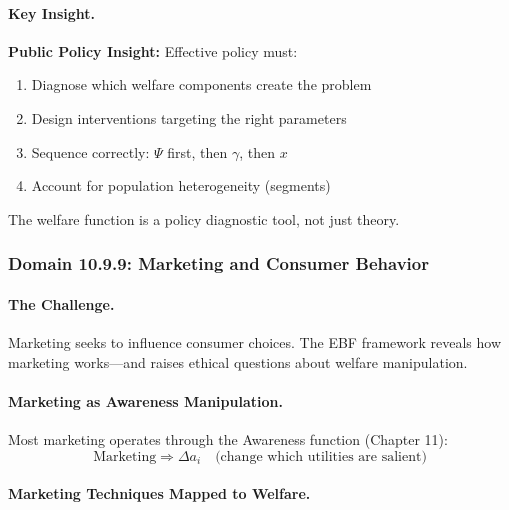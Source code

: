 \paragraph{Key Insight.}
\begin{tcolorbox}[colback=yellow!10!white, colframe=yellow!50!black]
\textbf{Public Policy Insight:}
Effective policy must:
\begin{enumerate}
\item Diagnose which welfare components create the problem
\item Design interventions targeting the right parameters
\item Sequence correctly: $\Psi$ first, then $\gamma$, then $x$
\item Account for population heterogeneity (segments)
\end{enumerate}
The welfare function is a policy diagnostic tool, not just theory.
\end{tcolorbox}

\subsubsection{Domain 10.9.9: Marketing and Consumer Behavior}
\label{subsubsec:marketing}

\paragraph{The Challenge.}
Marketing seeks to influence consumer choices. The EBF framework reveals
how marketing works---and raises ethical questions about welfare manipulation.

\paragraph{Marketing as Awareness Manipulation.}
Most marketing operates through the Awareness function (Chapter 11):
\begin{equation}
\text{Marketing} \Rightarrow \Delta a_i \quad \text{(change which utilities are salient)}
\end{equation}

\paragraph{Marketing Techniques Mapped to Welfare.}

